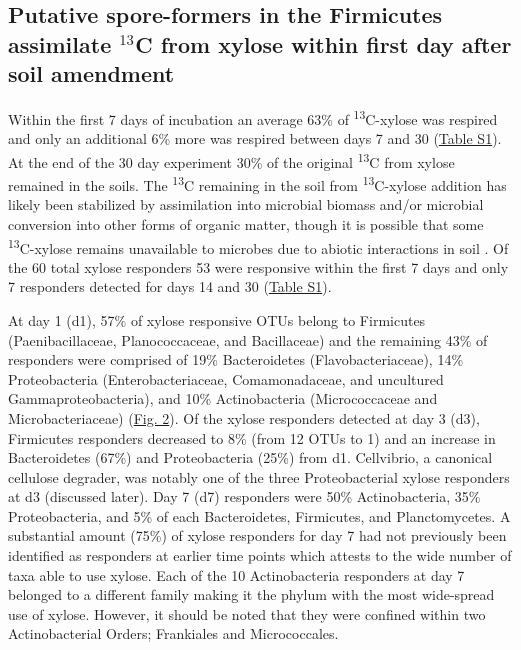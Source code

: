 \subsection{Putative spore-formers in the Firmicutes assimilate
$^{13}$C from xylose within first day after soil amendment} Within the first 7
days of incubation an average 63\% of \textsuperscript{13}C-xylose was respired
and only an additional 6\% more was respired between days 7 and 30
(\href{https://authorea.com/users/3537/articles/8459/master/file/figures/Percent_respired_13C/Percent_respired_13C.png}{Table
S1}). At the end of the 30 day experiment 30\% of the original
\textsuperscript{13}C from xylose remained in the soils. The
\textsuperscript{13}C remaining in the soil from \textsuperscript{13}C-xylose
addition has likely been stabilized by assimilation into microbial biomass
and/or microbial conversion into other forms of organic matter, though it is
possible that some \textsuperscript{13}C-xylose remains unavailable to microbes
due to abiotic interactions in soil \cite{Kalbitz_2000}. Of the 60 total xylose
responders 53 were responsive within the first 7 days and only 7 responders
detected for days 14 and 30
(\href{https://authorea.com/users/3537/articles/8459/master/file/figures/resp_table/resp_table.png}{Table
S1}). 

At day 1 (d1), 57\% of xylose responsive OTUs belong to Firmicutes
(Paenibacillaceae, Planococcaceae, and Bacillaceae) and the remaining 43\% of
responders were comprised of 19\% Bacteroidetes (Flavobacteriaceae), 14\%
Proteobacteria (Enterobacteriaceae, Comamonadaceae, and uncultured
Gammaproteobacteria), and 10\% Actinobacteria (Micrococcaceae and
Microbacteriaceae)
(\href{https://www.authorea.com/users/3537/articles/3612/master/file/figures/l2fc_fig1/l2fc_fig.pdf}{Fig.
2}). Of the xylose responders detected at day 3 (d3), Firmicutes responders
decreased to 8\% (from 12 OTUs to 1) and an increase in Bacteroidetes (67\%)
and Proteobacteria (25\%) from d1. Cellvibrio, a canonical cellulose degrader,
was notably one of the three Proteobacterial xylose responders at d3 (discussed
later). Day 7 (d7) responders were 50\% Actinobacteria, 35\% Proteobacteria,
and 5\% of each Bacteroidetes, Firmicutes, and Planctomycetes. A substantial
amount (75\%) of xylose responders for day 7 had not previously been identified
as responders at earlier time points which attests to the wide number of taxa
able to use xylose. Each of the 10 Actinobacteria responders at day 7 belonged
to a different family making it the phylum with the most wide-spread use of
xylose. However, it should be noted that they were confined within two
Actinobacterial Orders; Frankiales and Micrococcales. 

